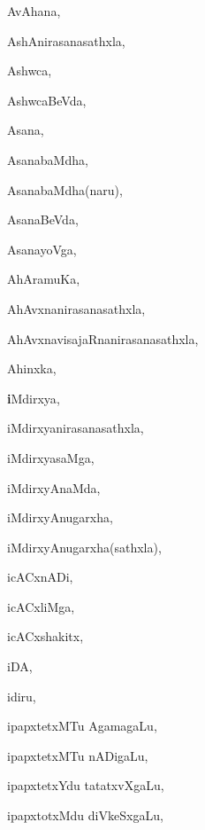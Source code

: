 \begin{multicols}{3}
{\noindent
{AvAhana}, \pageref{AvAhana}

\noindent
{AshAnirasanasathxla}, \pageref{AshAnirasanasathxla}

\noindent
{Ashwca}, \pageref{Ashwca}

\noindent
{AshwcaBeVda}, \pageref{AshwcaBeVda}

\noindent
{Asana}, \pageref{Asana}

\noindent
{AsanabaMdha}, \pageref{AsanabaMdha}

\noindent
{AsanabaMdha(naru)}, \pageref{AsanabaMdha(naru)}

\noindent
{AsanaBeVda}, \pageref{AsanaBeVda}

\noindent
{AsanayoVga}, \pageref{AsanayoVga}

\noindent
{AhAramuKa}, \pageref{AhAramuKa}

\noindent
{AhAvxnanirasanasathxla}, \pageref{AhAvxnanirasanasathxla}

\noindent
{AhAvxnavisajaRnanirasanasathxla}, \pageref{AhAvxnavisajaRnanirasanasathxla}

\noindent
{Ahinxka}, \pageref{Ahinxka}

\noindent
{{\large\textbf{i}}Mdirxya}, \pageref{iMdirxya}

\noindent
{iMdirxyanirasanasathxla}, \pageref{iMdirxyanirasanasathxla}

\noindent
{iMdirxyasaMga}, \pageref{iMdirxyasaMga}

\noindent
{iMdirxyAnaMda}, \pageref{iMdirxyAnaMda}

\noindent
{iMdirxyAnugarxha}, \pageref{iMdirxyAnugarxha}

\noindent
{iMdirxyAnugarxha(sathxla)}, \pageref{iMdirxyAnugarxha(sathxla)}

\noindent
{icACxnADi}, \pageref{icACxnADi}

\noindent
{icACxliMga}, \pageref{icACxliMga}

\noindent
{icACxshakitx}, \pageref{icACxshakitx}

\noindent
{iDA}, \pageref{iDA}

\noindent
{idiru}, \pageref{idiru}

\noindent
{ipapxtetxMTu AgamagaLu}, \pageref{ipapxtetxMTu AgamagaLu}

\noindent
{ipapxtetxMTu nADigaLu}, \pageref{ipapxtetxMTu nADigaLu}

\noindent
{ipapxtetxYdu tatatxvXgaLu}, \pageref{ipapxtetxYdu tatatxvXgaLu}

\noindent
{ipapxtotxMdu diVkeSxgaLu}, \pageref{ipapxtotxMdu diVkeSxgaLu}

}
\end{multicols}

